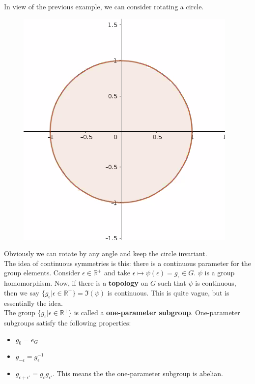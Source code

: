 \documentclass{book}
\theoremstyle{definition}
\begin{document}
In view of the previous example, we can consider rotating a circle. 
\begin{figure}[!htb]
	\centering
	\includegraphics[scale=0.3]{circ}
\end{figure}


Obviously we can rotate by any angle and keep the circle invariant. \\


The idea of continuous symmetries is this: there is a continuous parameter for the group elements. Consider $\epsilon \in \mathbb{R}^+$ and take $\epsilon \mapsto \psi(\epsilon) = g_\epsilon \in G$. $\psi$ is a group homomorphism. Now, if there is a \textbf{topology} on $G$ such that $\psi$ is continuous, then we say $\{ g_\epsilon \vert \epsilon \in \mathbb{R}^+  \} = \Im(\psi)$ is continuous. This is quite vague, but is essentially the idea. \\


The group $\{ g_\epsilon \vert \epsilon \in \mathbb{R}^+   \}$ is called a \textbf{one-parameter subgroup}. One-parameter subgroups satisfy the following properties:
\begin{itemize}
	\item $g_0 = e_G$
	\item $g_{-\epsilon} = g_\epsilon^{-1}$
	\item $g_{\epsilon + \epsilon'} = g_\epsilon g_{\epsilon'}$. This means the the one-parameter subgroup is abelian.
\end{itemize}
\end{document}
